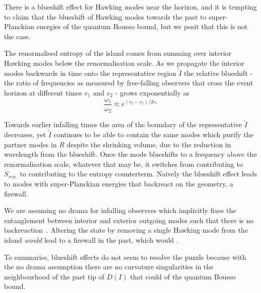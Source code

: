 \documentclass[a4paper,11pt]{article}
\def\bne{\begin{equation}}
\def\ene{\end{equation}}
\begin{document}
There is a blueshift effect for Hawking modes near the horizon, and it is tempting to claim that the blueshift of Hawking modes towards the past to super-Planckian energies  of the  quantum Bousso bound, but we posit that this is not the case.

The renormalised entropy of the island comes from summing over interior Hawking modes below the renormalisation scale. As we propagate the interior modes backwards in time onto the representative region $\tilde I$ the relative blueshift - the ratio of frequencies as measured by free-falling observers that cross the event horizon at different times $v_1$ and $v_2$ - grows exponentially as~\cite{Jacobson2005}
\bne \frac{\omega_1}{\omega_2} \approx e^{(v_2 - v_1)/2r_s} \ene

Towards earlier infalling times the area of the boundary of the representative $\tilde I$ decreases, yet $\tilde I$ continues to be able to contain the same modes which purify the partner modes in $R$ despite the shrinking volume, due to the reduction in wavelength from the blueshift. Once the mode blueshifts to a frequency above the renormalisation scale, whatever that may be, it switches from contributing to $S_{ren.}$ to contributing to the entropy counterterm. Naively the blueshift effect leads to modes with super-Planckian energies that backreact on the geometry, a firewall. 

We are assuming no drama for infalling observers which implicitly fixes the entanglement between interior and exterior outgoing modes such that there is no backreaction~\cite{Almheiri2013}. Altering the state by removing a single Hawking mode from the island \textit{would} lead to a firewall in the past, which would  .

To summarise, blueshift effects do not seem to resolve the puzzle because with the no drama assumption there are no curvature singularities in the neighbourhood of the past tip of $D(I)$ that could  of the quantum Bousso bound. 
  
\end{document}
